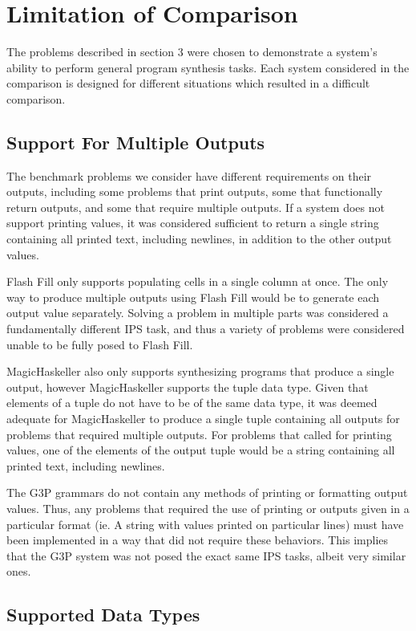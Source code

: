 \section{Limitation of Comparison}

The problems described in section 3 were chosen to demonstrate a system's ability to perform general program synthesis tasks. Each system considered in the comparison is designed for different situations which resulted in a difficult comparison.

\subsection{Support For Multiple Outputs}

The benchmark problems we consider have different requirements on their outputs, including some problems that print outputs, some that functionally return outputs, and some that require multiple outputs. If a system does not support printing values, it was considered sufficient to return a single string containing all printed text, including newlines, in addition to the other output values.

Flash Fill only supports populating cells in a single column at once. The only way to produce multiple outputs using Flash Fill would be to generate each output value separately. Solving a problem in multiple parts was considered a fundamentally different IPS task, and thus a variety of problems were considered unable to be fully posed to Flash Fill.

MagicHaskeller also only supports synthesizing programs that produce a single output, however MagicHaskeller supports the tuple data type. Given that elements of a tuple do not have to be of the same data type, it was deemed adequate for MagicHaskeller to produce a single tuple containing all outputs for problems that required multiple outputs. For problems that called for printing values, one of the elements of the output tuple would be a string containing all printed text, including newlines.

The G3P grammars do not contain any methods of printing or formatting output values. Thus, any problems that required the use of printing or outputs given in a particular format (ie. A string with values printed on particular lines) must have been implemented in a way that did not require these behaviors. This implies that the G3P system was not posed the exact same IPS tasks, albeit very similar ones.

\subsection{Supported Data Types}


